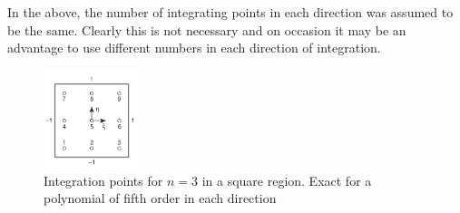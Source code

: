\documentclass[10pt,b5paper,titlepage]{book}
\begin{document}
In the above, the number of integrating points in each direction was assumed to be
the same. Clearly this is not necessary and on occasion it may be an advantage to
use different numbers in each direction of integration.

\begin{figure}[ht]
    \centering
    \includegraphics[width=0.25\textwidth]{img/quad_interpolation_3.png}
    \caption{Integration points for $ n = 3 $ in a square region. Exact for a
    polynomial of fifth order in each direction}
    \label{fig:quad-interpolation-3-png}
\end{figure}
\end{document}
